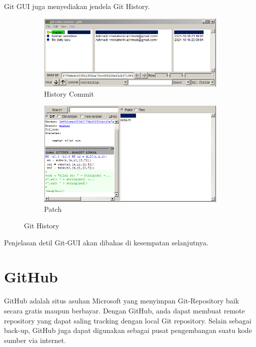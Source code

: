 \documentclass[12pt]{book}
\begin{document}
	Git GUI juga menyediakan jendela Git History.
	
	\begin{figure}[!ht]
		\centering
		\begin{subfigure}[b]{0.45\textwidth}
			\includegraphics[width=\textwidth]{images/gitgui2}
			\caption{History Commit}
		\end{subfigure}
		\begin{subfigure}[b]{0.45\textwidth}
			\includegraphics[width=\textwidth]{images/gitgui3}
			\caption{Patch}
		\end{subfigure}
		\caption{Git History}
	\end{figure}

	Penjelasan detil Git-GUI akan dibahas di kesempatan selanjutnya. 
	
	\newpage
	\section{GitHub}
	
	GitHub adalah situs asuhan Microsoft yang menyimpan Git-Repository baik secara gratis maupun berbayar.
	Dengan GitHub, anda dapat membuat remote repository yang dapat saling tracking dengan local Git repository.
	Selain sebagai back-up, GitHub juga dapat digunakan sebagai pusat pengembangan suatu kode sumber via internet.
	
\end{document}
